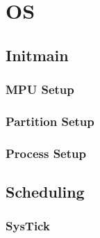 \section{OS}

\subsection{Init\/main}

\subsubsection{MPU Setup}
\subsubsection{Partition Setup}
\subsubsection{Process Setup}

\subsection{Scheduling}

\subsubsection{SysTick}

